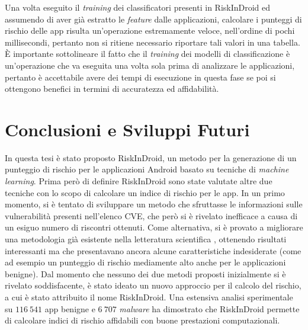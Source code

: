 \documentclass[12pt,a4paper,oneside]{article}
\begin{document}
\noindent Una volta eseguito il \textit{training} dei classificatori presenti in RiskInDroid ed assumendo di aver già estratto le \textit{feature} dalle applicazioni, calcolare i punteggi di rischio delle app risulta un'operazione estremamente veloce, nell'ordine di pochi millisecondi, pertanto non si ritiene necessario riportare tali valori in una tabella. È importante sottolineare il fatto che il \textit{training} dei modelli di classificazione è un'operazione che va eseguita una volta sola prima di analizzare le applicazioni, pertanto è accettabile avere dei tempi di esecuzione in questa fase se poi si ottengono benefici in termini di accuratezza ed affidabilità.
\newpage





\section{Conclusioni e Sviluppi Futuri}\label{sec:Conclusioni}

In questa tesi è stato proposto RiskInDroid, un metodo per la generazione di un punteggio di rischio per le applicazioni Android basato su tecniche di \textit{machine learning}. Prima però di definire RiskInDroid sono state valutate altre due tecniche con lo scopo di calcolare un indice di rischio per le app. In un primo momento, si è tentato di sviluppare un metodo che sfruttasse le informazioni sulle vulnerabilità presenti nell'elenco \gls{CVE}, che però si è rivelato inefficace a causa di un esiguo numero di riscontri ottenuti. Come alternativa, si è provato a migliorare una metodologia già esistente nella letteratura scientifica \cite{WANG_QUANTITATIVE}, ottenendo risultati interessanti ma che presentavano ancora alcune caratteristiche indesiderate (come ad esempio un punteggio di rischio mediamente alto anche per le applicazioni benigne). Dal momento che nessuno dei due metodi proposti inizialmente si è rivelato soddisfacente, è stato ideato un nuovo approccio per il calcolo del rischio, a cui è stato attribuito il nome RiskInDroid. Una estensiva analisi sperimentale su $116~541$ app benigne e $6~707$ \textit{malware} ha dimostrato che RiskInDroid permette di calcolare indici di rischio affidabili con buone prestazioni computazionali.
\end{document}
